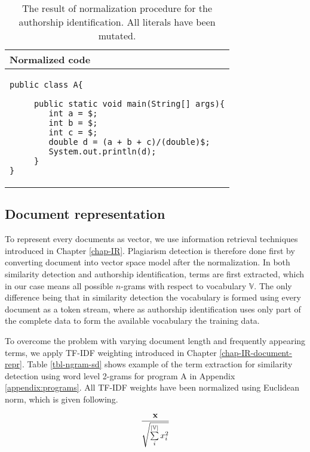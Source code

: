 \begin{table}[ht]
\centering
\caption{The result of normalization procedure for the authorship identification. All literals have been mutated.}
\label{tbl-ai-normalization}
\begin{tabular}{|l|} \hline
\bf Normalized code \\ \hline
\begin{lstlisting}
public class A{

     public static void main(String[] args){
        int a = $;
        int b = $;
        int c = $;
        double d = (a + b + c)/(double)$; 
        System.out.println(d);
     }
}
\end{lstlisting} 

\\ \hline      
\end{tabular}
\end{table}

\subsection{Document representation}

To represent every documents as vector, we use information retrieval techniques introduced in Chapter \ref{chap-IR}. Plagiarism detection is therefore done first by converting document into vector space model after the normalization. In both similarity detection and authorship identification, terms are first extracted, which in our case means all possible $n$-grams with respect to vocabulary $\mathbb{V}$. The only difference being that in similarity detection the vocabulary is formed using every document as a token stream, where as authorship identification uses only part of the complete data to form the available vocabulary \ie the training data. 

To overcome the problem with varying document length and frequently appearing terms, we apply TF-IDF weighting introduced in Chapter \ref{chap-IR-document-repr}. Table \ref{tbl-ngram-sd} shows example of the term extraction for similarity detection using word level 2-grams for program A in Appendix \ref{appendix:programs}. All TF-IDF weights have been normalized using Euclidean norm, which is given following.

\begin{equation}
    \dfrac{\mathbf{x}}
          {\sqrt{\sum \limits_i^{|\mathbb{V}|} x_i^2}}
\end{equation}


